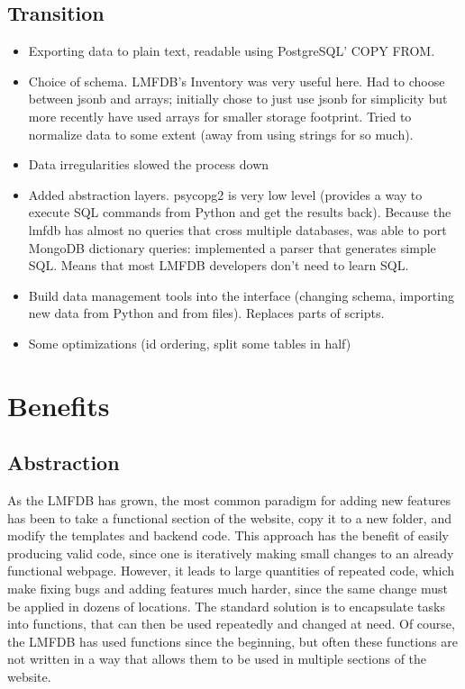 \documentclass{article}
\begin{document}
\subsection{Transition}

\begin{itemize}
\item Exporting data to plain text, readable using PostgreSQL' COPY FROM.
\item Choice of schema.  LMFDB's Inventory was very useful here.  Had to choose between jsonb and arrays; initially chose to just use jsonb for simplicity but more recently have used arrays for smaller storage footprint.  Tried to normalize data to some extent (away from using strings for so much).
\item Data irregularities slowed the process down
\item Added abstraction layers.  psycopg2 is very low level (provides a way to execute SQL commands from Python and get the results back).  Because the lmfdb has almost no queries that cross multiple databases, was able to port MongoDB dictionary queries: implemented a parser that generates simple SQL.  Means that most LMFDB developers don't need to learn SQL.
\item Build data management tools into the interface (changing schema, importing new data from Python and from files).  Replaces parts of scripts.
\item Some optimizations (id ordering, split some tables in half)
\end{itemize}

\section{Benefits}

\subsection{Abstraction}

As the LMFDB has grown, the most common paradigm for adding new features has been to take a functional section of the website, copy it to a new folder, and modify the templates and backend code.
This approach has the benefit of easily producing valid code, since one is iteratively making small changes to an already functional webpage.
However, it leads to large quantities of repeated code, which make fixing bugs and adding features much harder, since the same change must be applied in dozens of locations.
The standard solution is to encapsulate tasks into functions, that can then be used repeatedly and changed at need.
Of course, the LMFDB has used functions since the beginning, but often these functions are not written in a way that allows them to be used in multiple sections of the website.
\end{document}
